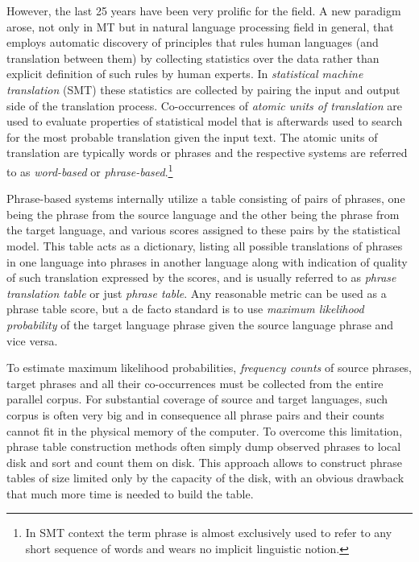 However, the last 25 years have been very prolific for the field.
A new paradigm arose, not only in MT but in natural language processing
field in general, that employs automatic discovery of principles that
rules human languages (and translation between them) by collecting
statistics over the data rather than explicit definition of such rules
by human experts.
In \emph{statistical machine translation} (SMT) these statistics are
collected by pairing the input and output side of the translation process.
Co-occurrences of \emph{atomic units of translation} are used to
evaluate properties of statistical model that is afterwards used to
search for the most probable translation given the input text.
The atomic units of translation are typically words or phrases and
the respective systems are referred to as \emph{word-based} or
\emph{phrase-based}.\footnote{In SMT context the term phrase is almost
exclusively used to refer to any short sequence of words and wears no
implicit linguistic notion.}

Phrase-based systems internally utilize a table consisting of pairs of
phrases, one being the phrase from the source language and the other
being the phrase from the target language, and various scores assigned to
these pairs by the statistical model.
This table acts as a dictionary, listing all possible translations of phrases
in one language into phrases in another language along with indication of
quality of such translation expressed by the scores, and is usually referred
to as \emph{phrase translation table} or just \emph{phrase table}.
Any reasonable metric can be used as a phrase table score, but a de facto
standard is to use \emph{maximum likelihood probability} of the target language
phrase given the source language phrase and vice versa.

To estimate maximum likelihood probabilities, \emph{frequency counts} of source
phrases, target phrases and all their co-occurrences must be collected from
the entire parallel corpus.
For substantial coverage of source and target languages, such corpus is often
very big and in consequence all phrase pairs and their counts cannot fit in
the physical memory of the computer.
To overcome this limitation, phrase table construction methods often simply
dump observed phrases to local disk and sort and count them on disk.
This approach allows to construct phrase tables of size limited only by
the capacity of the disk, with an obvious drawback that much more time is
needed to build the table.

